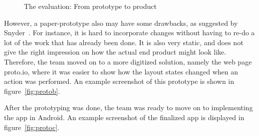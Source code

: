 \begin{figure}[H]
  \centering
\quad
\quad
\caption{The evaluation: From prototype to product}
\end{figure}

\noindent However, a paper-prototype also may have some drawbacks, as suggested by Snyder~\cite{paperprototype}. For instance, it is hard to incorporate changes without having to re-do a lot of the work that has already been done. It is also very static, and does not give the right impression on how the actual end product might look like. Therefore, the team moved on to a more digitized solution, namely the web page proto.io, where it was easier to show how the layout states changed when an action was performed. An example screenshot of this prototype is shown in figure~\ref{fig:protob}.

After the prototyping was done, the team was ready to move on to implementing the app in Android. An example screenshot of the finalized app is displayed in figure~\ref{fig:protoc}.

